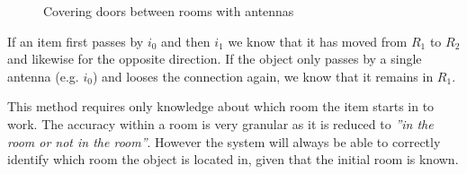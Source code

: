 \begin{figure}[h]
\centering

\caption{Covering doors between rooms with antennas}
\label{rooms:fig:rooms}
\end{figure}

If an item first passes by $i_0$ and then $i_1$ we know that it has moved from $R_1$ to $R_2$ and likewise for the opposite direction.
If the object only passes by a single antenna (e.g. $i_0$) and looses the connection again, we know that it remains in $R_1$.

This method requires only knowledge about which room the item starts in to work.
The accuracy within a room is very granular as it is reduced to \textit{''in the room or not in the room''}.
However the system will always be able to correctly identify which room the object is located in, given that the initial room is known.
